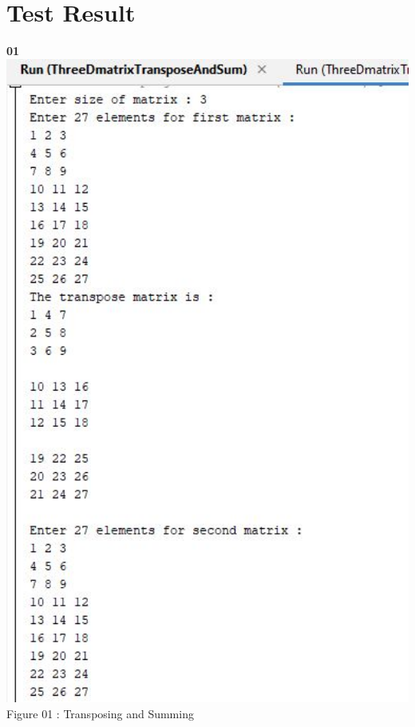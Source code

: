 \documentclass{article}
\begin{document}
\section{Test Result}
\large \textbf{01}
 \includegraphics[width=1\textwidth]{terminal1.JPG}
 \centering
\large Figure 01 : Transposing and Summing
\vspace{0.5cm}
\end{document}
